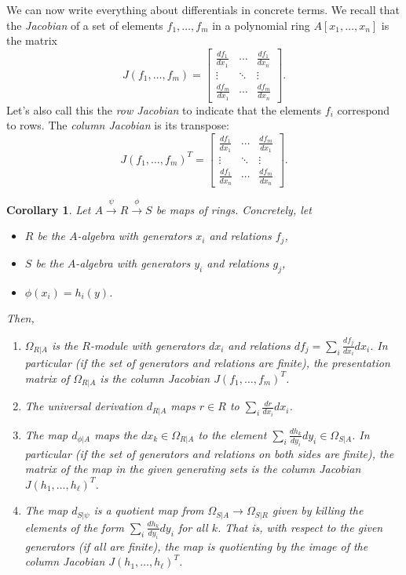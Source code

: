 \documentclass{amsart}[12pt]
\numberwithin{equation}{section}
\theoremstyle{plain} %
\newtheorem{cor}[equation]{Corollary}
\theoremstyle{definition}
\theoremstyle{remark}
\newcommand{\xra}[1]{\xrightarrow{#1}}
\begin{document}
We can now write everything about differentials in concrete terms. We recall that the \emph{Jacobian} of a set of elements $f_1,\dots,f_m$ in a polynomial ring $A[x_1,\dots,x_n]$ is the matrix
\[ J(f_1,\dots,f_m) = \begin{bmatrix} \frac{df_1}{dx_1} & \cdots & \frac{df_1}{dx_n}\\ 
\vdots & \ddots & \vdots \\
 \frac{df_m}{dx_1} & \cdots & \frac{df_m}{dx_n} \end{bmatrix}.\]
 Let's also call this the \emph{row Jacobian} to indicate that the elements $f_i$ correspond to rows. The \emph{column Jacobian} is its transpose:
 \[ J(f_1,\dots,f_m)^T = \begin{bmatrix} \frac{df_1}{dx_1} & \cdots & \frac{df_m}{dx_1}\\ 
\vdots & \ddots & \vdots \\
 \frac{df_1}{dx_n} & \cdots & \frac{df_m}{dx_n} \end{bmatrix}.\]

\begin{cor} Let $A\xra{\psi} R\xra{\phi} S$ be maps of rings. Concretely, let
\begin{itemize}
\item $R$ be the $A$-algebra with generators $x_i$ and relations $f_j$,
\item $S$ be the $A$-algebra with generators $y_i$ and relations $g_j$,
\item $\phi(x_i)=h_i(y)$.
\end{itemize}
Then,
\begin{enumerate}
\item $\Omega_{R|A}$ is the $R$-module with generators $dx_i$ and relations $df_j=\sum_i \frac{df_j}{dx_i} dx_i$. In particular (if the set of generators and relations are finite), the presentation matrix of $\Omega_{R|A}$ is the column Jacobian $J(f_1,\dots,f_m)^T$.
\item The universal derivation $d_{R|A}$ maps $r\in R$ to $\sum_{i} \frac{dr}{dx_i} dx_i$. 
\item The map $d_{\phi|A}$ maps the $ dx_k \in \Omega_{R|A}$ to the element $\sum_i \frac{dh_k}{dy_i} dy_i \in \Omega_{S|A}$. In particular (if the set of generators and relations on both sides are finite), the matrix of the map in the given generating sets is the column Jacobian $J(h_1,\dots,h_\ell)^T$.
\item The map $d_{S|\psi}$ is a quotient map from $\Omega_{S|A} \to \Omega_{S|R}$ given by killing the elements of the form $\sum_i \frac{dh_k}{dy_i} dy_i$ for all $k$. That is, with respect to the given generators (if all are finite), the map is quotienting by the image of the column Jacobian $J(h_1,\dots,h_\ell)^T$.
\end{enumerate}
\end{cor}
\end{document}
